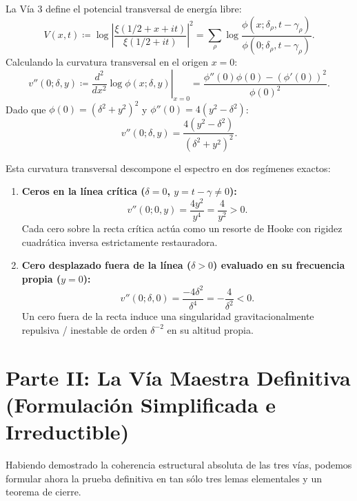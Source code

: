 \documentclass[11pt,a4paper]{article}
\theoremstyle{definition}
\theoremstyle{remark}
\begin{document}
La Vía 3 define el potencial transversal de energía libre:
\begin{equation}
V(x, t) \coloneqq \log \left| \frac{\xi(1/2 + x + it)}{\xi(1/2 + it)} \right|^2 = \sum_{\rho} \log \frac{\phi(x; \delta_\rho, t - \gamma_\rho)}{\phi(0; \delta_\rho, t - \gamma_\rho)}.
\end{equation}
Calculando la curvatura transversal en el origen $x = 0$:
\begin{equation}
v''(0; \delta, y) \coloneqq \left. \frac{d^2}{dx^2} \log \phi(x; \delta, y) \right|_{x=0} = \frac{\phi''(0)\phi(0) - (\phi'(0))^2}{\phi(0)^2}.
\end{equation}
Dado que $\phi(0) = (\delta^2 + y^2)^2$ y $\phi''(0) = 4(y^2 - \delta^2)$:
\begin{equation}
v''(0; \delta, y) = \frac{4(y^2 - \delta^2)}{(\delta^2 + y^2)^2}.
\end{equation}

Esta curvatura transversal descompone el espectro en dos regímenes exactos:
\begin{enumerate}
    \item \textbf{Ceros en la línea crítica ($\delta = 0$, $y = t - \gamma \neq 0$):}
    \begin{equation}
    v''(0; 0, y) = \frac{4y^2}{y^4} = \frac{4}{y^2} > 0.
    \end{equation}
    Cada cero sobre la recta crítica actúa como un resorte de Hooke con rigidez cuadrática inversa estrictamente restauradora.
    \item \textbf{Cero desplazado fuera de la línea ($\delta > 0$) evaluado en su frecuencia propia ($y = 0$):}
    \begin{equation}
    v''(0; \delta, 0) = \frac{-4\delta^2}{\delta^4} = -\frac{4}{\delta^2} < 0.
    \end{equation}
    Un cero fuera de la recta induce una singularidad gravitacionalmente repulsiva / inestable de orden $\delta^{-2}$ en su altitud propia.
\end{enumerate}

\section{Parte II: La Vía Maestra Definitiva (Formulación Simplificada e Irreductible)}

Habiendo demostrado la coherencia estructural absoluta de las tres vías, podemos formular ahora la prueba definitiva en tan sólo tres lemas elementales y un teorema de cierre.
\end{document}
